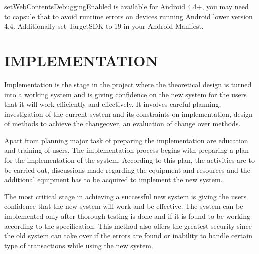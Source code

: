 \documentclass{article}
\begin{document}
\par setWebContentsDebuggingEnabled is available for Android 4.4+, you may need to capsule that to avoid runtime errors on devices running Android lower version 4.4. Additionally set TargetSDK to 19 in your Android Manifest.





\newpage
\section{IMPLEMENTATION}
\par Implementation is the stage in the project where the theoretical design is turned into a working system and is giving confidence on the new system for the users that it will work efficiently and effectively. It involves careful planning, investigation of the current system and its constraints on implementation, design of methods to achieve the changeover, an evaluation of change over methods.
\par  Apart from planning major task of preparing the implementation are education and training of users. The implementation process begins with preparing a plan for the implementation of the system. According to this plan, the activities are to be carried out, discussions made regarding the equipment and resources and the additional equipment has to be acquired to implement the new system.
\par  The most critical stage in achieving a successful new system is giving the users confidence that the new system will work and be effective. The system can be implemented only after thorough testing is done and if it is found to be working according to the specification. This method also offers the greatest security since the old system can take over if the errors are found or inability to handle certain type of transactions while using the new system.


\newpage
\end{document}
